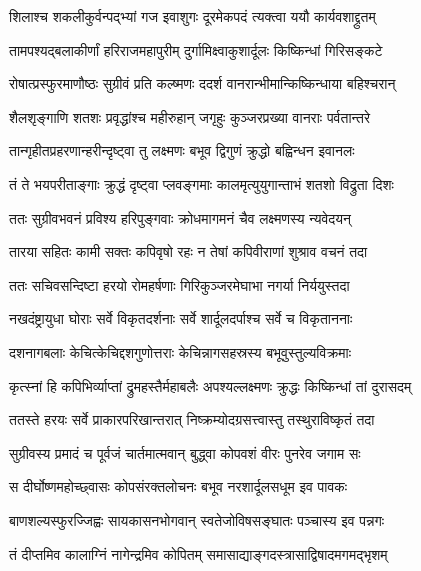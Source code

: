 \twolineshloka
{शिलाश्च शकलीकुर्वन्पद्भ्यां गज इवाशुगः}
{दूरमेकपदं त्यक्त्वा ययौ कार्यवशाद्द्रुतम्} %

\twolineshloka
{तामपश्यद्बलाकीर्णां हरिराजमहापुरीम्}
{दुर्गामिक्ष्वाकुशार्दूलः किष्किन्धां गिरिसङ्कटे} %

\twolineshloka
{रोषात्प्रस्फुरमाणौष्ठः सुग्रीवं प्रति कल्ष्मणः}
{ददर्श वानरान्भीमान्किष्किन्धाया बहिश्चरान्} %

\twolineshloka
{शैलशृङ्गाणि शतशः प्रवृद्धांश्च महीरुहान्}
{जगृहुः कुञ्जरप्रख्या वानराः पर्वतान्तरे} %

\twolineshloka
{तान्गृहीतप्रहरणान्हरीन्दृष्ट्वा तु लक्ष्मणः}
{बभूव द्विगुणं क्रुद्धो बह्विन्धन इवानलः} %

\twolineshloka
{तं ते भयपरीताङ्गाः क्रुद्धं दृष्ट्वा प्लवङ्गमाः}
{कालमृत्युयुगान्ताभं शतशो विद्रुता दिशः} %

\twolineshloka
{ततः सुग्रीवभवनं प्रविश्य हरिपुङ्गवाः}
{क्रोधमागमनं चैव लक्ष्मणस्य न्यवेदयन्} %

\twolineshloka
{तारया सहितः कामी सक्तः कपिवृषो रहः}
{न तेषां कपिवीराणां शुश्राव वचनं तदा} %

\twolineshloka
{ततः सचिवसन्दिष्टा हरयो रोमहर्षणाः}
{गिरिकुञ्जरमेघाभा नगर्या निर्ययुस्तदा} %

\twolineshloka
{नखदंष्ट्रायुधा घोराः सर्वे विकृतदर्शनाः}
{सर्वे शार्दूलदर्पाश्च सर्वे च विकृताननाः} %

\twolineshloka
{दशनागबलाः केचित्केचिद्दशगुणोत्तराः}
{केचिन्नागसहस्रस्य बभूवुस्तुल्यविक्रमाः} %

\twolineshloka
{कृत्स्नां हि कपिभिर्व्याप्तां द्रुमहस्तैर्महाबलैः}
{अपश्यल्लक्ष्मणः क्रुद्धः किष्किन्धां तां दुरासदम्} %

\twolineshloka
{ततस्ते हरयः सर्वे प्राकारपरिखान्तरात्}
{निष्क्रम्योदग्रसत्त्वास्तु तस्थुराविष्कृतं तदा} %

\twolineshloka
{सुग्रीवस्य प्रमादं च पूर्वजं चार्तमात्मवान्}
{बुद्ध्वा कोपवशं वीरः पुनरेव जगाम सः} %

\twolineshloka
{स दीर्घोष्णमहोच्छ्वासः कोपसंरक्तलोचनः}
{बभूव नरशार्दूलसधूम इव पावकः} %

\twolineshloka
{बाणशल्यस्फुरज्जिह्वः सायकासनभोगवान्}
{स्वतेजोविषसङ्घातः पञ्चास्य इव पन्नगः} %

\twolineshloka
{तं दीप्तमिव कालाग्निं नागेन्द्रमिव कोपितम्}
{समासाद्याङ्गदस्त्रासाद्विषादमगमद्भृशम्} %

